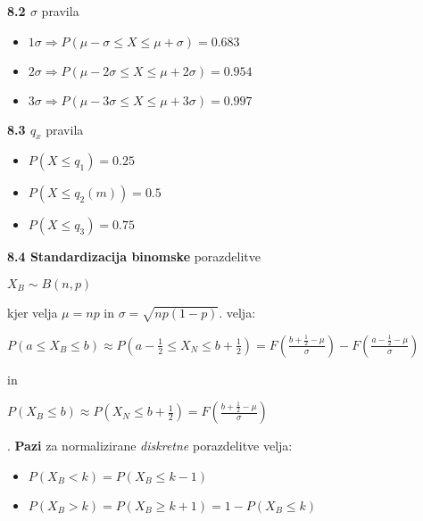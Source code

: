 \documentclass{article}
\begin{document}
\begin{multicols}{2}
\textbf{8.2 $\sigma$}  pravila

\begin{itemize}
    \item \begin{math}
        1 \sigma \Rightarrow P(\mu - \sigma \leq X \leq \mu + \sigma) = 0.683
    \end{math}

    \item \begin{math}
        2 \sigma \Rightarrow P(\mu - 2\sigma \leq X \leq \mu + 2\sigma) = 0.954
    \end{math}

    \item \begin{math}
        3 \sigma \Rightarrow P(\mu - 3\sigma \leq X \leq \mu + 3\sigma) = 0.997
    \end{math}
\end{itemize}

\textbf{8.3 $q_x$} pravila

\begin{itemize}
    \item $P (X \leq q_1) = 0.25$
    \item $P (X \leq q_2(m)) = 0.5$
    \item $P (X \leq q_3) = 0.75$
\end{itemize}

\textbf{8.4 Standardizacija binomske} porazdelitve
\begin{center}
    \begin{math}
        X_B \sim B(n, p)
    \end{math}
\end{center}
kjer velja $\mu = np$ in $\sigma = \sqrt{np(1-p)}$.
velja:
\begin{center}
    \begin{math}
        P(a \leq X_B \leq b) \approx P(a - \frac{1}{2} \leq X_N \leq b + \frac{1}{2})
        = F(\frac{b + \frac{1}{2} - \mu}{\sigma}) - F(\frac{a - \frac{1}{2} - \mu}{\sigma})
    \end{math}
\end{center}
in
\begin{center}
    \begin{math}
        P(X_B \leq b) \approx P(X_N \leq b + \frac{1}{2}) = F(\frac{b + \frac{1}{2} - \mu}{\sigma})
    \end{math}
\end{center}.
\textbf{Pazi} za normalizirane \textit{diskretne} porazdelitve velja:
\begin{itemize}
    \item $P(X_B < k) = P(X_B \leq k - 1)$
    \item $P(X_B > k) = P(X_B \geq k + 1) = 1 - P(X_B \leq k)$
\end{itemize}



\end{multicols}
\end{document}
